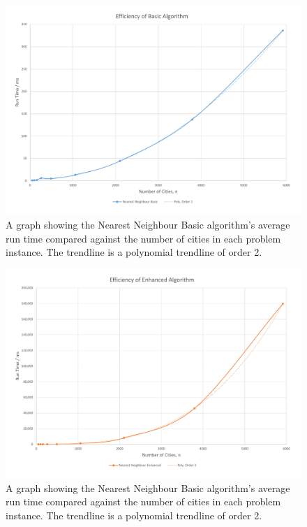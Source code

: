 \documentclass[conference,backref=page]{acmsiggraph}
\begin{document}
\clearpage
\begin{figure}[h]
	\vspace{-3in}
	\includegraphics[width=\textwidth]{images/efficiency_basic.pdf}
	\caption{A graph showing the Nearest Neighbour Basic algorithm's average run time compared against the number of cities in each problem instance. The trendline is a polynomial trendline of order 2.}
	\label{efficiencybasicgraph}
\end{figure}


\begin{figure}[h]
	\includegraphics[width=\textwidth]{images/efficiency_enhanced.pdf}
	\caption{A graph showing the Nearest Neighbour Basic algorithm's average run time compared against the number of cities in each problem instance. The trendline is a polynomial trendline of order 2.}
	\label{efficiencyenhancedgraph}
\end{figure}
\end{document}
